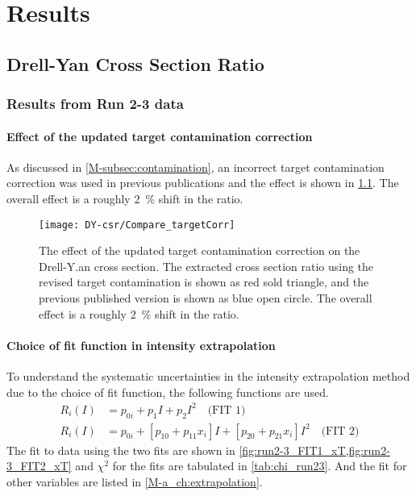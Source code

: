 \documentclass[../main.tex]{subfiles}
\begin{document}
\ifSubfilesClassLoaded{
	\mainmatter
	\setcounter{chapter}{5}
}{}

\chapter{Results}
\label{ch:result}
\section{Drell-Yan Cross Section Ratio}
\subsection{Results from Run 2-3 data}
\subsubsection{Effect of the updated target contamination correction}
\label{subsubsec:contamination_result}
As discussed in \cref{M-subsec:contamination}, an incorrect target contamination correction was used
in previous publications and the effect is shown in \cref{fig:contaimination_CSR}.
The overall effect is a roughly \SI{2}{\percent} shift in the ratio.
\begin{figure}[h!]
	\centering
	\texttt{[image: DY-csr/Compare\_targetCorr]}
	\caption{The effect of the updated target contamination correction on the Drell-Y.an
		cross section. The extracted cross section ratio using the revised target contamination
		is shown as red sold triangle, and the previous published version is shown as blue open
		circle. The overall effect is a roughly \SI{2}{\percent} shift in the ratio. }
	\label{fig:contaimination_CSR}
\end{figure}



\subsubsection{Choice of fit function in intensity extrapolation}
To understand the systematic uncertainties in the intensity extrapolation method due to the
choice of fit function, the following functions are used.
\begin{align}
	R_i\left(I\right) & = p_{0i} + p_{1} I + p_{2} I^2 \quad\text{(FIT 1)}                                                     \\
	R_i\left(I\right) & = p_{0i} + \left[p_{10} + p_{11}x_i\right] I + \left[p_{20} + p_{21}x_i\right]I^2 \quad \text{(FIT 2)}
\end{align}
The fit to data using the two fits are shown in \cref{fig:run2-3_FIT1_xT,fig:run2-3_FIT2_xT}
and $\chi^2$ for the fits are tabulated in \cref{tab:chi_run23}.
And the fit for other variables are listed in \cref{M-a_ch:extrapolation}.


\end{document}

